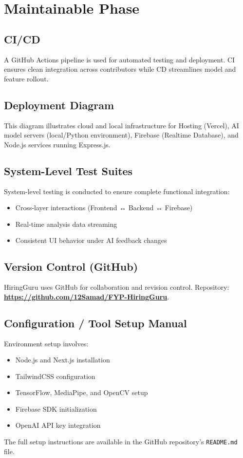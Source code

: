 \section{Maintainable Phase}

\subsection{CI/CD}
A GitHub Actions pipeline is used for automated testing and deployment. CI ensures clean integration across contributors while CD streamlines model and feature rollout.

\subsection{Deployment Diagram}
This diagram illustrates cloud and local infrastructure for Hosting (Vercel), AI model servers (local/Python environment), Firebase (Realtime Database), and Node.js services running Express.js.

\subsection{System-Level Test Suites}
System-level testing is conducted to ensure complete functional integration:
\begin{itemize}
    \item Cross-layer interactions (Frontend ↔ Backend ↔ Firebase)
    \item Real-time analysis data streaming
    \item Consistent UI behavior under AI feedback changes
\end{itemize}

\subsection{Version Control (GitHub)}
HiringGuru uses GitHub for collaboration and revision control. Repository: \textbf{\url{https://github.com/12Samad/FYP-HiringGuru}}.

\subsection{Configuration / Tool Setup Manual}
Environment setup involves:
\begin{itemize}
    \item Node.js and Next.js installation
    \item TailwindCSS configuration
    \item TensorFlow, MediaPipe, and OpenCV setup
    \item Firebase SDK initialization
    \item OpenAI API key integration
\end{itemize}
The full setup instructions are available in the GitHub repository’s \texttt{README.md} file.

